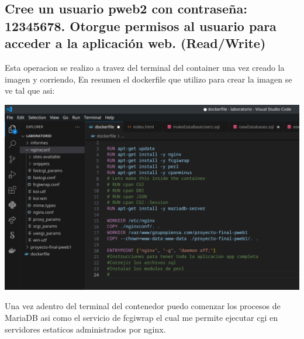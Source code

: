 	\subsection{Cree un usuario pweb2 con contraseña: 12345678. \newline
	Otorgue permisos al usuario para acceder a la aplicación web. (Read/Write) \newline}

	Esta operacion se realizo a travez del terminal del container una vez creado la imagen y corriendo,
	En resumen el dockerfile que utilizo para crear la imagen se ve tal que asi:

	\includegraphics[scale=0.4]{./img/lab1_1.png}
	
	Una vez adentro del terminal del contenedor puedo comenzar los procesos de MariaDB asi como el servicio de fcgiwrap
	el cual me permite ejecutar cgi en servidores estaticos administrados por nginx.\newline \newline

